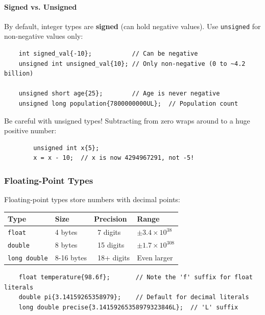 \paragraph{Signed vs. Unsigned}

By default, integer types are \textbf{signed} (can hold negative values). Use \texttt{unsigned} for non-negative values only:

\begin{lstlisting}
	int signed_val{-10};           // Can be negative
	unsigned int unsigned_val{10}; // Only non-negative (0 to ~4.2 billion)
	
	unsigned short age{25};        // Age is never negative
	unsigned long population{7800000000UL};  // Population count
\end{lstlisting}

\begin{remark}
	Be careful with unsigned types! Subtracting from zero wraps around to a huge positive number:
	
	\begin{lstlisting}
		unsigned int x{5};
		x = x - 10;  // x is now 4294967291, not -5!
	\end{lstlisting}
\end{remark}

\subsubsection{Floating-Point Types}

Floating-point types store numbers with decimal points:

\begin{center}
	\begin{tabular}{|l|l|l|l|}
		\hline
		\textbf{Type} & \textbf{Size} & \textbf{Precision} & \textbf{Range} \\
		\hline
		\texttt{float} & 4 bytes & ~7 digits & $\pm 3.4 \times 10^{38}$ \\
		\texttt{double} & 8 bytes & ~15 digits & $\pm 1.7 \times 10^{308}$ \\
		\texttt{long double} & 8-16 bytes & ~18+ digits & Even larger \\
		\hline
	\end{tabular}
\end{center}

\begin{lstlisting}
	float temperature{98.6f};       // Note the 'f' suffix for float literals
	double pi{3.14159265358979};    // Default for decimal literals
	long double precise{3.14159265358979323846L};  // 'L' suffix
\end{lstlisting}

